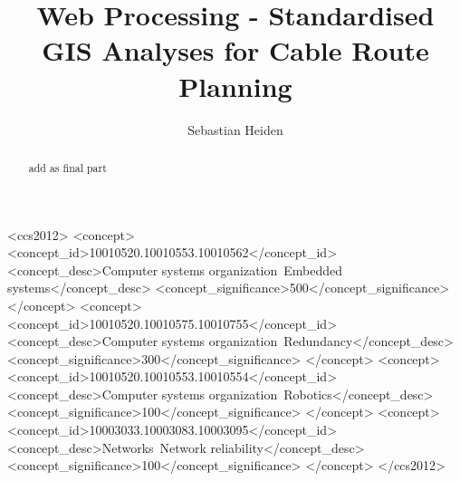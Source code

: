 \documentclass[acmtog]{acmart}
\begin{document}
	\title{Web Processing - Standardised GIS Analyses for Cable Route Planning}
	
	\author{Sebastian Heiden}
	
	
	\renewcommand{\shortauthors}{Heiden}
	
	\begin{abstract}
		add as final part
	\end{abstract}
	
	\begin{CCSXML}
		<ccs2012>
		<concept>
		<concept_id>10010520.10010553.10010562</concept_id>
		<concept_desc>Computer systems organization~Embedded systems</concept_desc>
		<concept_significance>500</concept_significance>
		</concept>
		<concept>
		<concept_id>10010520.10010575.10010755</concept_id>
		<concept_desc>Computer systems organization~Redundancy</concept_desc>
		<concept_significance>300</concept_significance>
		</concept>
		<concept>
		<concept_id>10010520.10010553.10010554</concept_id>
		<concept_desc>Computer systems organization~Robotics</concept_desc>
		<concept_significance>100</concept_significance>
		</concept>
		<concept>
		<concept_id>10003033.10003083.10003095</concept_id>
		<concept_desc>Networks~Network reliability</concept_desc>
		<concept_significance>100</concept_significance>
		</concept>
		</ccs2012>
	\end{CCSXML}
	
	
	
	
	\maketitle
	
\end{document}
